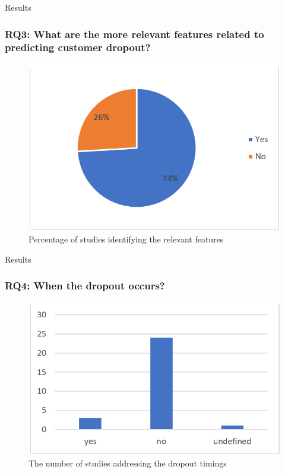 \documentclass[10pt]{beamer}
\begin{document}
\begin{frame}[fragile]{Results}
	\frametitle{RQ3: What are the more relevant features related to predicting customer dropout?}
	\begin{figure}
		\includegraphics[scale=0.5]{../img/relevantFeatures.png}
		\caption{Percentage of studies identifying the relevant features}
		\label{figure4}
	\end{figure}
\end{frame}

\begin{frame}[fragile]{Results}
	\frametitle{RQ4: When the dropout occurs?}
	\begin{figure}
		\includegraphics[scale=0.5]{../img/dropoutTimings.png}
		\caption{The number of studies addressing the dropout timings}
		\label{figure4}
	\end{figure}
\end{frame}
\end{document}
